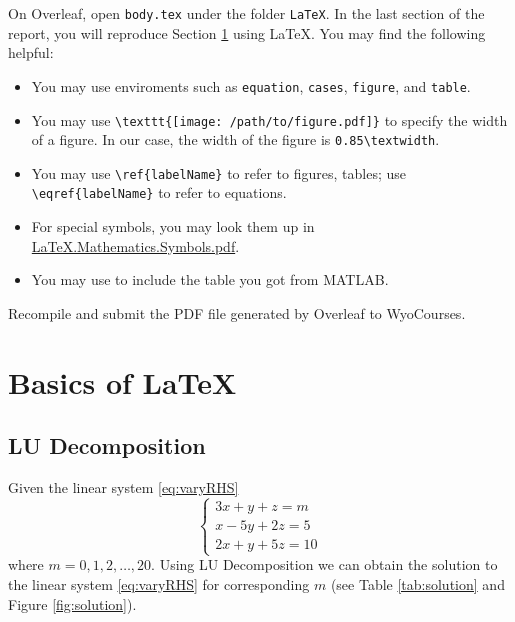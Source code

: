 On Overleaf, open \verb|body.tex| under the folder \verb|LaTeX|. In the last section of the report, you will reproduce Section \ref{sec:bol} using \LaTeX{}. You may find the following helpful:

\begin{itemize}
  \item You may use enviroments such as  \verb|equation|, \verb|cases|, \verb|figure|, and \verb|table|.
  \item You may use \verb|\texttt{[image: /path/to/figure.pdf]}| to specify the width of a figure. In our case, the width of the figure is \verb|0.85\textwidth|.
  \item You may use \verb|\ref{labelName}| to refer to figures, tables; use \verb|\eqref{labelName}| to refer to equations.
  \item For special symbols, you may look them up in \href{https://libaoj.in/files/LaTeX.Mathematical.Symbols.pdf}{\LaTeX{}.Mathematics.Symbols.pdf}.
  \item You may use \verb|| to include the table you got from MATLAB.
\end{itemize}

Recompile and submit the PDF file generated by Overleaf to WyoCourses.

\newpage
\section{Basics of \LaTeX{}}
\label{sec:bol}
\subsection{LU Decomposition}

Given the linear system \eqref{eq:varyRHS}
\begin{equation}
  \label{eq:varyRHS}
  \begin{cases}
    3x + y + z = m \\
    x - 5y + 2z = 5 \\
    2x + y + 5z = 10
  \end{cases}
\end{equation}
where $m = 0, 1, 2, \ldots, 20$. Using LU Decomposition we can obtain the solution to the linear system \eqref{eq:varyRHS} for corresponding $m$ (see Table \ref{tab:solution} and Figure \ref{fig:solution}).



